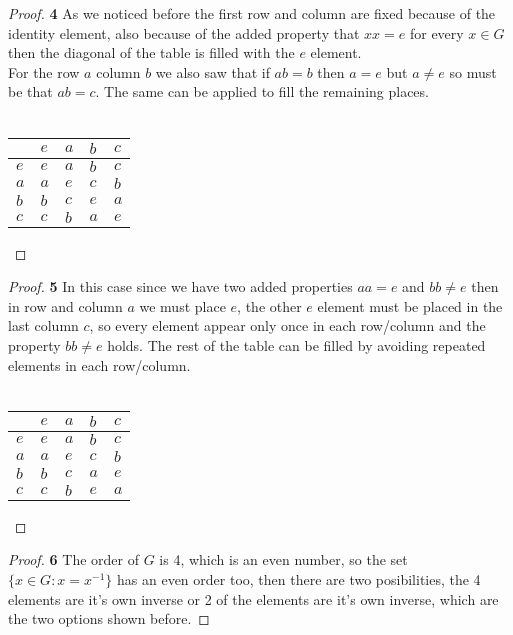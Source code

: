 \documentclass[11pt]{article}
\begin{document}
\cleardoublepage
		\begin{proof}{\textbf{4}}
			As we noticed before the first row and column are fixed because of the identity element, also because of the added property that $xx=e$ for every $x \in G$ then the diagonal of the table is filled with the $e$ element.\\
			For the row $a$ column $b$ we also saw that if $ab=b$ then $a=e$ but $a \neq e$ so must be that $ab=c$. The same can be applied to fill the remaining places.\\\\
			\begin{adjustbox}{max width=\textwidth,center}
			\begin{tabular}{l|llll}
				  & $e$ & $a$ & $b$ & $c$ \\ \hline
				$e$ & $e$ & $a$ & $b$ & $c$\\
				$a$ & $a$ & $e$ & $c$ & $b$ \\
				$b$ & $b$ & $c$ & $e$ & $a$ \\
				$c$ & $c$ & $b$ & $a$ & $e$ \\
			\end{tabular}
			\end{adjustbox}
		\end{proof}
		\begin{proof}{\textbf{5}}
			In this case since we have two added properties $aa=e$ and $bb \neq e$ then in row and column $a$ we must place $e$, the other $e$ element must be placed in the last column $c$, so every element appear only once in each row/column and the property $bb \neq e$ holds. The rest of the table can be filled by avoiding repeated elements in each row/column.\\\\
			\begin{adjustbox}{max width=\textwidth,center}
			\begin{tabular}{l|llll}
				    & $e$ & $a$ & $b$ & $c$ \\ \hline
				$e$ & $e$ & $a$ & $b$ & $c$\\
				$a$ & $a$ & $e$ & $c$ & $b$ \\
				$b$ & $b$ & $c$ & $a$ & $e$ \\
				$c$ & $c$ & $b$ & $e$ & $a$ \\
			\end{tabular}
			\end{adjustbox}
		\end{proof}
		\begin{proof}{\textbf{6}}
			The order of $G$ is 4, which is an even number, so the set $\{x \in G: x=x^{-1}\}$ has an even order too, then there are two posibilities, the 4 elements are it's own inverse or 2 of the elements are it's own inverse, which are the two options shown before.
		\end{proof}
\end{document}
